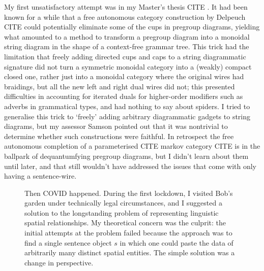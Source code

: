 My first unsatisfactory attempt was in my Master's thesis \bR CITE \e. It had been known for a while that a free autonomous category construction by Delpeuch \bR CITE \e could potentially eliminate some of the cups in pregroup diagrams, yielding what amounted to a method to transform a pregroup diagram into a monoidal string diagram in the shape of a context-free grammar tree. This trick had the limitation that freely adding directed cups and caps to a string diagrammatic signature did not turn a symmetric monoidal category into a (weakly) compact closed one, rather just into a monoidal category where the original wires had braidings, but all the new left and right dual wires did not; this presented difficulties in accounting for iterated duals for higher-order modifiers such as adverbs in grammatical types, and had nothing to say about spiders. I tried to generalise this trick to `freely' adding arbitrary diagrammatic gadgets to string diagrams, but my assessor Samson pointed out that it was nontrivial to determine whether such constructions were faithful. In retrospect the free autonomous completion of a parameterised \bR CITE \e markov category \bR CITE \e is in the ballpark of dequantumfying pregroup diagrams, but I didn't learn about them until later, and that still wouldn't have addressed the issues that come with only having a sentence-wire.

\begin{figure}[h!]
\centering
{}
\caption{Then COVID happened. During the first lockdown, I visited Bob's garden under technically legal circumstances, and I suggested a solution to the longstanding problem of representing linguistic spatial relationships. My theoretical concern was the culprit: the initial attempts at the problem failed because the approach was to find a single sentence object $s$ in which one could paste the data of arbitrarily many distinct spatial entities. The simple solution was a change in perspective.}
\end{figure}

